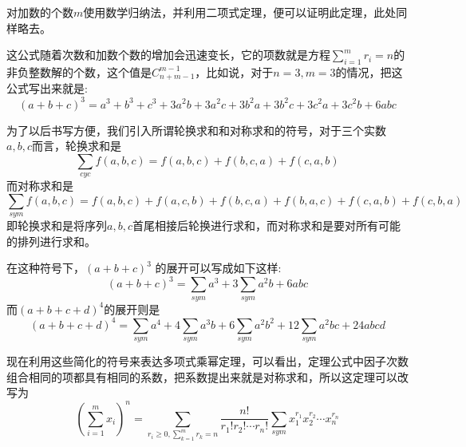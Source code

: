 对加数的个数$m$使用数学归纳法，并利用二项式定理，便可以证明此定理，此处同样略去。

这公式随着次数和加数个数的增加会迅速变长，它的项数就是方程$\sum_{i=1}^mr_i=n$的非负整数解的个数，这个值是$C_{n+m-1}^{m-1}$，比如说，对于$n=3,m=3$的情况，把这公式写出来就是:
\begin{equation*}
  (a+b+c)^3 = a^3+b^3+c^3+3a^2b+3a^2c+3b^2a+3b^2c+3c^2a+3c^2b+6abc
\end{equation*}

为了以后书写方便，我们引入所谓轮换求和和对称求和的符号，对于三个实数$a,b,c$而言，轮换求和是
\begin{equation*}
  \sum_{cyc} f(a,b,c) = f(a,b,c) + f(b, c, a) + f(c, a ,b)
\end{equation*}
而对称求和是
\begin{equation*}
  \sum_{sym} f(a,b,c) = f(a, b, c) + f(a, c, b) + f(b, c, a) + f(b, a, c) + f(c, a, b) + f(c, b, a)
\end{equation*}
即轮换求和是将序列$a,b,c$首尾相接后轮换进行求和，而对称求和是要对所有可能的排列进行求和。

在这种符号下，$(a+b+c)^3$ 的展开可以写成如下这样:
\begin{equation*}
  (a+b+c)^3 = \sum_{sym}a^3+3\sum_{sym}a^2b+6abc
\end{equation*}
而$(a+b+c+d)^4$的展开则是
\begin{equation*}
  (a+b+c+d)^4 = \sum_{sym} a^4 + 4 \sum_{sym}a^3b + 6\sum_{sym}a^2b^2+12\sum_{sym}a^2bc+24abcd
\end{equation*}

现在利用这些简化的符号来表达多项式乘幂定理，可以看出，定理公式中因子次数组合相同的项都具有相同的系数，把系数提出来就是对称求和，所以这定理可以改写为
\begin{equation*}
  \left( \sum_{i=1}^m x_i \right)^n = \sum_{r_i \geqslant 0, \sum_{k=1}^m r_k=n} \frac{n!}{r_1!r_2!\cdots r_n!} \sum_{sym} x_1^{r_1}x_2^{r_2}\cdots x_n^{r_n}
\end{equation*}

